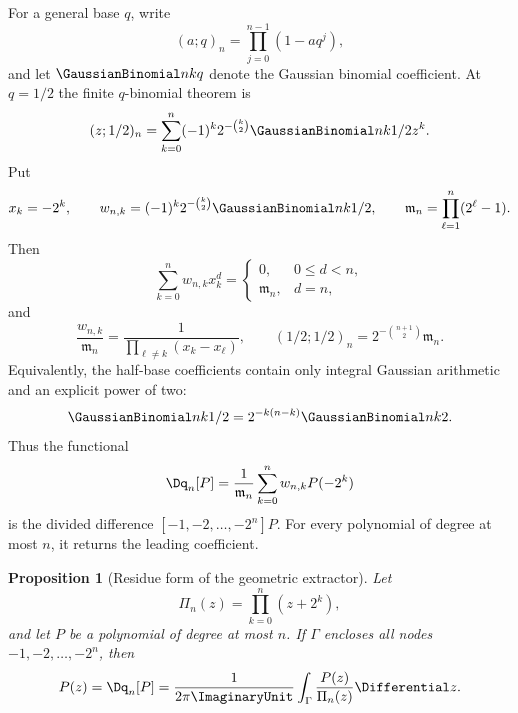 \documentclass[11pt,oneside]{article}
\newtheorem{proposition}[proposition]{Proposition}
\theoremstyle{definition}
\theoremstyle{remark}
\begin{document}
For a general base $q$, write
\begin{equation}
 (a;q)_n=\prod_{j=0}^{n-1}(1-aq^j),                       \label{dyadicweb:eq:qpoch-def-local}
\end{equation}
and let $\GaussianBinomial nkq$ denote the Gaussian binomial coefficient.  At $q=1/2$ the finite
$q$-binomial theorem is
\begin{equation}
 (z;1/2)_n=\sum_{k=0}^{n}(-1)^k2^{-\binom k2}
 \GaussianBinomial nk{1/2}z^k.                                      \label{dyadicweb:eq:finite-q-binomial-local}
\end{equation}
Put
\begin{equation}
 x_k=-2^k,
 \qquad
 w_{n,k}=(-1)^k2^{-\binom k2}\GaussianBinomial nk{1/2},
 \qquad
 \mathfrak m_n=\prod_{\ell=1}^{n}(2^\ell-1).              \label{dyadicweb:eq:q-nodes-weights}
\end{equation}
Then
\begin{equation}
 \sum_{k=0}^{n}w_{n,k}x_k^d=
 \begin{cases}
 0,&0\le d<n,\\
 \mathfrak m_n,&d=n,
 \end{cases}                                               \label{dyadicweb:eq:q-node-moments}
\end{equation}
and
\begin{equation}
 \frac{w_{n,k}}{\mathfrak m_n}
 =\frac1{\prod_{\ell\ne k}(x_k-x_\ell)},
 \qquad
 (1/2;1/2)_n=2^{-\binom{n+1}{2}}\mathfrak m_n.             \label{dyadicweb:eq:q-barycentric-normalization}
\end{equation}
Equivalently, the half-base coefficients contain only integral Gaussian arithmetic and an
explicit power of two:
\begin{equation}
 \GaussianBinomial nk{1/2}=2^{-k(n-k)}\GaussianBinomial nk2.
 \label{dyadicweb:eq:qbinomial-inversion}
\end{equation}
Thus the functional
\begin{equation}
 \Dq_n[P]=\frac1{\mathfrak m_n}\sum_{k=0}^{n}w_{n,k}P(-2^k) \label{dyadicweb:eq:Dq-def}
\end{equation}
is the divided difference $[-1,-2,\ldots,-2^n]P$.  For every polynomial of degree at most
$n$, it returns the leading coefficient.

\begin{proposition}[Residue form of the geometric extractor]
\label{dyadicweb:prop:q-residue-extractor}
Let
\[
 \Pi_n(z)=\prod_{k=0}^{n}(z+2^k),
\]
and let $P$ be a polynomial of degree at most $n$.  If $\Gamma$ encloses all nodes
$-1,-2,\ldots,-2^n$, then
\begin{equation}
 [z^n]P(z)=\Dq_n[P]
 =\frac{1}{2\pi\ImaginaryUnit}\int_\Gamma\frac{P(z)}{\Pi_n(z)}\Differential z. \label{dyadicweb:eq:q-residue-extractor}
\end{equation}
\end{proposition}
\end{document}
